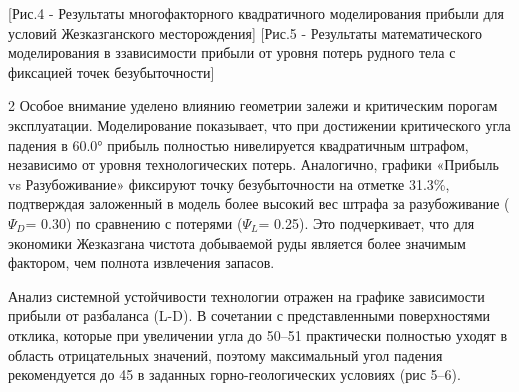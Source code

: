 [Рис.4 - Результаты многофакторного квадратичного моделирования
прибыли для условий Жезказганского месторождения]
[Рис.5 - Результаты математического моделирования в ззависимости
прибыли от уровня потерь рудного тела с фиксацией точек безубыточности]

\begin{multicols}{2}
Особое внимание уделено влиянию геометрии залежи и критическим порогам
эксплуатации. Моделирование показывает, что при достижении критического
угла падения в 60.0° прибыль полностью нивелируется квадратичным
штрафом, независимо от уровня технологических потерь. Аналогично,
графики «Прибыль vs Разубоживание» фиксируют точку безубыточности на
отметке 31.3\%, подтверждая заложенный в модель более высокий вес штрафа
за разубоживание (\(\Psi_{D}\)= 0.30) по сравнению с потерями
(\(\Psi_{L}\)= 0.25). Это подчеркивает, что для экономики Жезказгана
чистота добываемой руды является более значимым фактором, чем полнота
извлечения запасов.

Анализ системной устойчивости технологии отражен на графике зависимости
прибыли от разбаланса (L-D). В сочетании с представленными поверхностями
отклика, которые при увеличении угла до
50--51 практически полностью
уходят в область отрицательных значений, поэтому максимальный угол
падения рекомендуется до 45 в заданных
горно-геологических условиях (рис 5--6).
\end{multicols}

\begin{figs}
\end{figs}
\vspace{0.5cm}
\begin{figs}
\end{figs}

